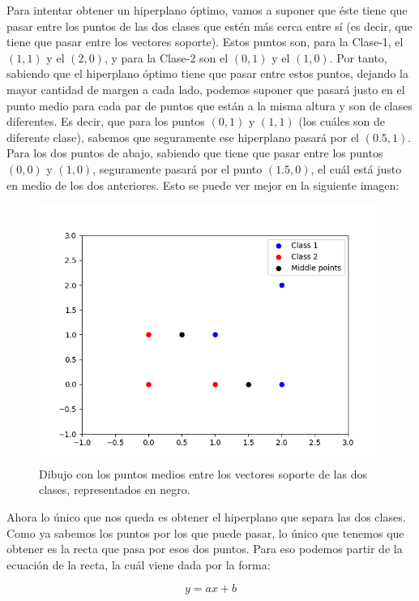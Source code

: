 \documentclass[11pt,a4paper]{article}
\begin{document}
Para intentar obtener un hiperplano óptimo, vamos a suponer que éste tiene que pasar entre los puntos de las dos clases que estén más
cerca entre sí (es decir, que tiene que pasar entre los vectores soporte). Estos puntos son, para la Clase-1, el $(1, 1)$ y el
$(2, 0)$, y para la Clase-2 son el $(0,1)$ y el $(1, 0)$. Por tanto, sabiendo que el hiperplano óptimo tiene que pasar entre estos
puntos, dejando la mayor cantidad de margen a cada lado, podemos suponer que pasará justo en el punto medio para cada par de puntos
que están a la misma altura y son de clases diferentes. Es decir, que para los puntos $(0, 1)$ y $(1, 1)$ (los cuáles son de
diferente clase), sabemos que seguramente ese hiperplano pasará por el $(0.5, 1)$. Para los dos puntos de abajo, sabiendo que tiene
que pasar entre los puntos $(0, 0)$ y $(1, 0)$, seguramente pasará por el punto $(1.5, 0)$, el cuál está justo en medio de los
dos anteriores. Esto se puede ver mejor en la siguiente imagen:

\begin{figure}[H]
\centering
\includegraphics[scale=0.6]{img/middle.png}
\caption{Dibujo con los puntos medios entre los vectores soporte de las dos clases, representados en negro.}
\end{figure}

Ahora lo único que nos queda es obtener el hiperplano que separa las dos clases. Como ya sabemos los puntos por los que puede pasar,
lo único que tenemos que obtener es la recta que pasa por esos dos puntos. Para eso podemos partir de la ecuación de la recta, la cuál
viene dada por la forma:

\begin{equation}
\label{line}
y = ax + b
\end{equation}
\end{document}
